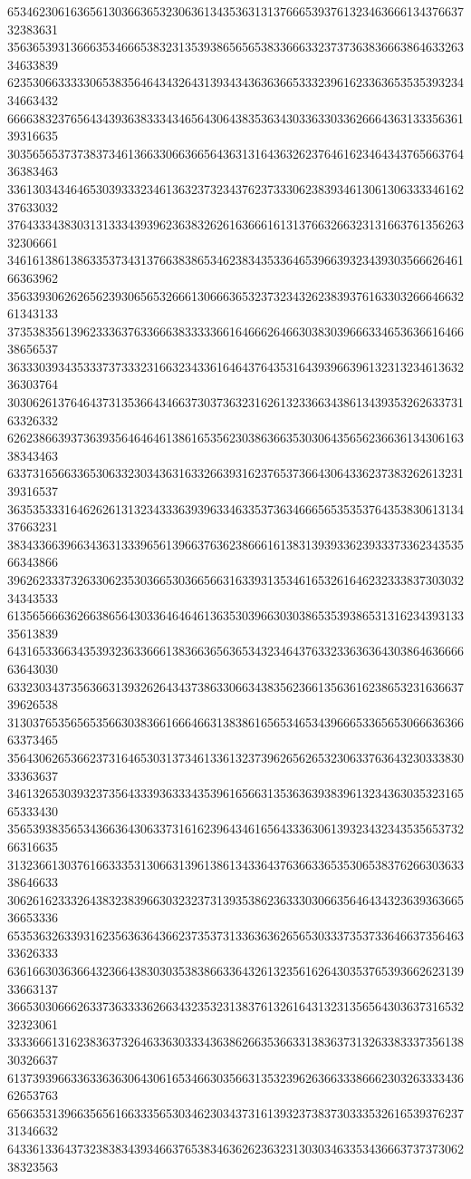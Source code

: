 65346230616365613036636532306361343536313137666539376132346366613437663732383631
35636539313666353466653832313539386565653833666332373736383666386463326334633839
62353066333330653835646434326431393434363636653332396162336365353539323434663432
66663832376564343936383334346564306438353634303363303362666436313335636139316635
30356565373738373461366330663665643631316436326237646162346434376566376436383463
33613034346465303933323461363237323437623733306238393461306130633334616237633032
37643334383031313334393962363832626163666161313766326632313166376135626332306661
34616138613863353734313766383865346238343533646539663932343930356662646166363962
35633930626265623930656532666130666365323732343262383937616330326664663261343133
37353835613962333637633666383333366164666264663038303966633465363661646638656537
36333039343533373733323166323433616464376435316439396639613231323461363236303764
30306261376464373135366434663730373632316261323366343861343935326263373163326332
62623866393736393564646461386165356230386366353030643565623663613430616338343463
63373165663365306332303436316332663931623765373664306433623738326261323139316537
36353533316462626131323433363939633463353736346665653535376435383061313437663231
38343366396634363133396561396637636238666161383139393362393337336234353566343866
39626233373263306235303665303665663163393135346165326164623233383730303234343533
61356566636266386564303364646461363530396630303865353938653131623439313335613839
64316533663435393236336661383663656365343234643763323363636430386463666663643030
63323034373563663139326264343738633066343835623661356361623865323163663739626538
31303765356565356630383661666466313838616565346534396665336565306663636663373465
35643062653662373164653031373461336132373962656265323063376364323033383033363637
34613265303932373564333936333435396165663135363639383961323436303532316565333430
35653938356534366364306337316162396434616564333630613932343234353565373266316635
31323661303761663335313066313961386134336437636633653530653837626630363338646633
30626162333264383238396630323237313935386236333030663564643432363936366536653336
65353632633931623563636436623735373133636362656530333735373364663735646333626333
63616630363664323664383030353838663364326132356162643035376539366262313933663137
36653030666263373633336266343235323138376132616431323135656430363731653232323061
33336661316238363732646336303334363862663536633138363731326338333735613830326637
61373939663363363630643061653466303566313532396263663338666230326333343662653763
65663531396635656166333565303462303437316139323738373033353261653937623731346632
64336133643732383834393466376538346362623632313030346335343666373737306238323563
